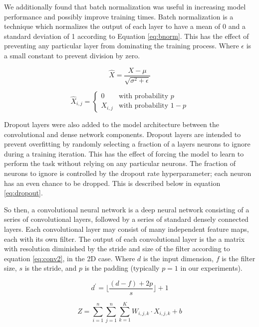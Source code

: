 \documentclass[10pt]{article}
\begin{document}
We additionally found that batch normalization was useful in increasing model performance and
possibly improve training times. Batch normalization is a technique which normalizes the
output of each layer to have a mean of 0 and a standard deviation of 1 according to
Equation \ref{eq:bnorm}. This has the effect of preventing any particular layer from
dominating the training process. Where $\epsilon$ is a small constant to prevent
division by zero.

\begin{minipage}{0.45\linewidth}
  \begin{equation}\label{eq:bnorm}
    \hat{X} = \frac{X - \mu}{\sqrt{\sigma^2 + \epsilon}}
  \end{equation}
\end{minipage}
\hfill
\begin{minipage}{0.45\linewidth}
  \begin{equation}\label{eq:dropout}
    \hat{X}_{i,j} = \begin{cases}
      0 & \text{with probability } p \\
      X_{i,j} & \text{with probability } 1-p
    \end{cases}
  \end{equation}
\end{minipage}

Dropout layers were also added to the model architecture between the convolutional
and dense network components. Dropout layers are intended to prevent overfitting
by randomly selecting a fraction of a layers neurons to ignore during a training
iteration. This has the effect of forcing the model to learn to perform the task
without relying on any particular neurons. The fraction of neurons to ignore is
controlled by the dropout rate hyperparameter; each neuron has an even chance to
be dropped. This is described below in equation \ref{eq:dropout}.

So then, a convolutional neural network is a deep neural network consisting of
a series of convolutional layers, followed by a series of standard densely connected
layers. Each convolutional layer may consist of many independent feature maps, each
with its own filter. The output of each convolutional layer is the a matrix
with resolution diminished by the stride and size of the filter according to
equation \ref{eq:conv2}, in the 2D case. Where $d$ is the input dimension, $f$ is
the filter size, $s$ is the stride, and $p$ is the padding (typically  $p = 1$
in our experiments).

\begin{minipage}{0.45\linewidth}
  \begin{equation}\label{eq:conv2}
    d^\prime = \lfloor \frac{(d - f) + 2p}{s} \rfloor + 1
  \end{equation}
\end{minipage}
\hfill
\begin{minipage}{0.45\linewidth}
  \begin{equation}\label{eq:conv3}
    Z = \sum_{i=1}^{n}\sum_{j=1}^{n}\sum_{k=1}^{K} W_{i,j,k} \cdot X_{i,j,k} + b
  \end{equation}
\end{minipage}
\end{document}
